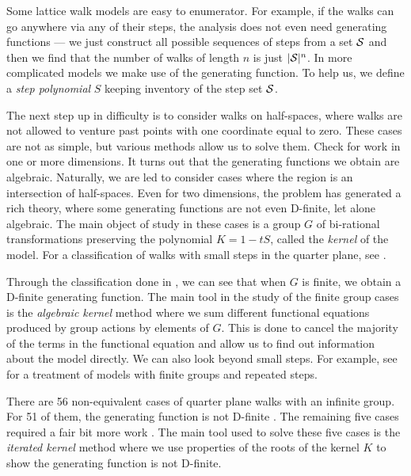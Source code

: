 Some lattice walk models are easy to enumerator. For example, if the walks can go anywhere via any of their steps, the analysis does not even need generating functions --- we just construct all possible sequences of steps from a set $\mathcal{S}$ and then we find that the number of walks of length $n$ is just $|\mathcal{S}|^n$. In more complicated models we make use of the generating function. To help us, we define a \emph{step polynomial} $S$ keeping inventory of the step set $\mathcal{S}$.

The next step up in difficulty is to consider walks on half-spaces, where walks are not allowed to venture past points with one coordinate equal to zero. These cases are not as simple, but various methods allow us to solve them. Check \cite{gessel1980factorization, bousquet2000linear, duchon2000enumeration, banderier2002basic, bousquet2000linear, kurkova2011explicit} for work in one or more dimensions. It turns out that the generating functions we obtain are algebraic. Naturally, we are led to consider cases where the region is an intersection of half-spaces. Even for two dimensions, the problem has generated a rich theory, where some generating functions are not even D-finite, let alone algebraic. The main object of study in these cases is a group $G$ of bi-rational transformations preserving the polynomial $K = 1- t S$, called the \emph{kernel} of the model. For a classification of \twoD walks with small steps in the quarter plane, see \cite{bousquet2010walks}.

Through the classification done in \cite{mishna2009classifying, bousquet2010walks, bousquet2005walks, bostan2010complete, kurkova2011explicit}, we can see that  when $G$ is finite, we obtain a D-finite generating function. The main tool in the study of the finite group cases is the \emph{algebraic kernel} method where we sum different functional equations produced by group actions by elements of $G$. This is done to cancel the majority of the terms in the functional equation and allow us to find out information about the model directly. We can also look beyond small steps. For example, see \cite{kauers2014walks} for a treatment of models with finite groups and repeated steps.

There are 56 non-equivalent cases of quarter plane walks with an infinite group. For 51 of them, the generating function is not D-finite \cite{bostan2014non} . The remaining five cases required a fair bit more work \cite{melczer2014singularity, melczer2014variants}. The main tool used to solve these five cases is the \emph{iterated kernel} method where we use properties of the roots of the kernel $K$ to show the generating function is not D-finite.

